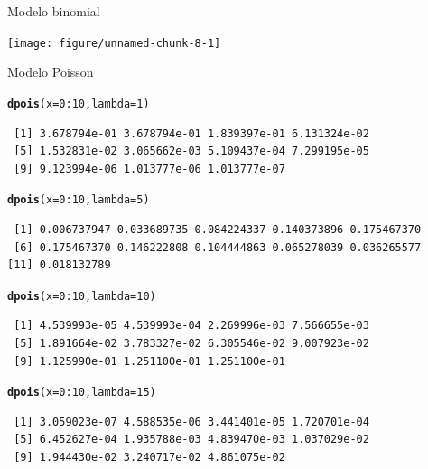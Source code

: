 \documentclass[10pt]{beamer}\usepackage[]{graphicx}\usepackage[]{color}
\makeatletter
\newcommand{\hlnum}[1]{\textcolor[rgb]{0.686,0.059,0.569}{#1}}%
\newcommand{\hlopt}[1]{\textcolor[rgb]{0,0,0}{#1}}%
\newcommand{\hlstd}[1]{\textcolor[rgb]{0.345,0.345,0.345}{#1}}%
\newcommand{\hlkwc}[1]{\textcolor[rgb]{0.333,0.667,0.333}{#1}}%
\newcommand{\hlkwd}[1]{\textcolor[rgb]{0.737,0.353,0.396}{\textbf{#1}}}%
\newenvironment{kframe}{%
 \def\at@end@of@kframe{}%
 \ifinner\ifhmode%
  \def\at@end@of@kframe{\end{minipage}}%
  \begin{minipage}{\columnwidth}%
 \fi\fi%
 \def\FrameCommand##1{\hskip\@totalleftmargin \hskip-\fboxsep
 \colorbox{shadecolor}{##1}\hskip-\fboxsep
     \hskip-\linewidth \hskip-\@totalleftmargin \hskip\columnwidth}%
 \MakeFramed {\advance\hsize-\width
   \@totalleftmargin\z@ \linewidth\hsize
   \@setminipage}}%
 {\par\unskip\endMakeFramed%
 \at@end@of@kframe}
\newenvironment{knitrout}{}{} %
\theoremstyle{definition}
\makeatother
\begin{document}
\begin{frame}[fragile]{Modelo binomial}
\begin{knitrout}\small
{}\color{fgcolor}

{\centering \texttt{[image: figure/unnamed-chunk-8-1]} 

}



\end{knitrout}
\end{frame}

\begin{frame}[fragile]{Modelo Poisson}
\begin{knitrout}\small
{}\color{fgcolor}\begin{kframe}
\begin{alltt}
\hlkwd{dpois}\hlstd{(}\hlkwc{x} \hlstd{=} \hlnum{0}\hlopt{:}\hlnum{10}\hlstd{,} \hlkwc{lambda} \hlstd{=} \hlnum{1}\hlstd{)}
\end{alltt}
\begin{verbatim}
 [1] 3.678794e-01 3.678794e-01 1.839397e-01 6.131324e-02
 [5] 1.532831e-02 3.065662e-03 5.109437e-04 7.299195e-05
 [9] 9.123994e-06 1.013777e-06 1.013777e-07
\end{verbatim}
\begin{alltt}
\hlkwd{dpois}\hlstd{(}\hlkwc{x} \hlstd{=} \hlnum{0}\hlopt{:}\hlnum{10}\hlstd{,} \hlkwc{lambda} \hlstd{=} \hlnum{5}\hlstd{)}
\end{alltt}
\begin{verbatim}
 [1] 0.006737947 0.033689735 0.084224337 0.140373896 0.175467370
 [6] 0.175467370 0.146222808 0.104444863 0.065278039 0.036265577
[11] 0.018132789
\end{verbatim}
\begin{alltt}
\hlkwd{dpois}\hlstd{(}\hlkwc{x} \hlstd{=} \hlnum{0}\hlopt{:}\hlnum{10}\hlstd{,} \hlkwc{lambda} \hlstd{=} \hlnum{10}\hlstd{)}
\end{alltt}
\begin{verbatim}
 [1] 4.539993e-05 4.539993e-04 2.269996e-03 7.566655e-03
 [5] 1.891664e-02 3.783327e-02 6.305546e-02 9.007923e-02
 [9] 1.125990e-01 1.251100e-01 1.251100e-01
\end{verbatim}
\begin{alltt}
\hlkwd{dpois}\hlstd{(}\hlkwc{x} \hlstd{=} \hlnum{0}\hlopt{:}\hlnum{10}\hlstd{,} \hlkwc{lambda} \hlstd{=} \hlnum{15}\hlstd{)}
\end{alltt}
\begin{verbatim}
 [1] 3.059023e-07 4.588535e-06 3.441401e-05 1.720701e-04
 [5] 6.452627e-04 1.935788e-03 4.839470e-03 1.037029e-02
 [9] 1.944430e-02 3.240717e-02 4.861075e-02
\end{verbatim}
\end{kframe}
\end{knitrout}
\end{frame}
\end{document}
